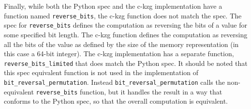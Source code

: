 \documentclass[12pt]{galois-whitepaper}
\begin{document}
Finally, while both the Python spec and the c-kzg implementation have a function named \texttt{reverse\_bits}, the c-kzg function does not
match the spec. The spec for \texttt{reverse\_bits} defines the computation as reversing the bits of a value for some specified bit length. The c-kzg
function defines the computation as reversing all the bits of the value as defined by the size of the memory representation (in this case a 64-bit integer). The
c-kzg implementation has a separate function, \texttt{reverse\_bits\_limited} that does match the Python spec. It should be noted that this spec
equivalent function is not used in the implementation of \texttt{bit\_reversal\_permutation}. Instead \texttt{bit\_reversal\_permutation} calls the
non-equivalent \texttt{reverse\_bits} function, but it handles the result in a way that conforms to the Python spec, so that the overall computation
is equivalent.
\end{document}
